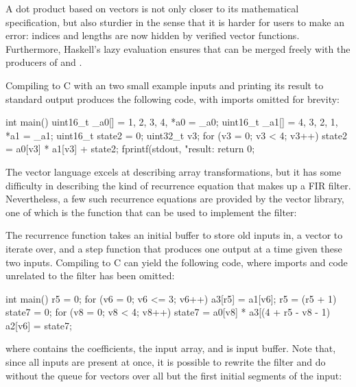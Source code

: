 \documentclass[../paper.tex]{subfiles}
\begin{document}
A dot product based on vectors is not only closer to its mathematical specification, but also sturdier in the sense that it is harder for users to make an error: indices and lengths are now hidden by verified vector functions. Furthermore, Haskell's lazy evaluation ensures that  can be merged freely with the producers of  and .

Compiling  to C with an two small example inputs and printing its result to standard output produces the following code, with imports omitted for brevity:

\begin{code}
int main() {
  uint16_t _a0[] = {1, 2, 3, 4}, *a0 = _a0;
  uint16_t _a1[] = {4, 3, 2, 1}, *a1 = _a1;
  uint16_t state2 = 0;
  uint32_t v3;
  for (v3 = 0; v3 < 4; v3++)
    state2 = a0[v3] * a1[v3] + state2;
  fprintf(stdout, "result: %
  return 0;
}
\end{code}

The vector language excels at describing array transformations, but it has some difficulty in describing the kind of recurrence equation that makes up a FIR filter. Nevertheless, a few such recurrence equations are provided by the vector library, one of which is the  function that can be used to implement the filter:


\noindent The recurrence function takes an initial buffer to store old inputs in, a vector to iterate over, and a step function that produces one output at a time given these two inputs. Compiling  to C can yield the following code, where imports and code unrelated to the filter has been omitted:

\begin{code}
int main() {    
  r5 = 0;
  for (v6 = 0; v6 <= 3; v6++) {
    a3[r5] = a1[v6];
    r5 = (r5 + 1) %
    state7 = 0;
    for (v8 = 0; v8 < 4; v8++)
      state7 = a0[v8] * a3[(4 + r5 - v8 - 1) %
    a2[v6] = state7;
  }
}
\end{code}

\noindent where  contains the coefficients,  the input array, and  is input buffer. Note that, since all inputs are present at once, it is possible to rewrite the filter and do without the queue for vectors over all but the first initial segments of the input:
\end{document}
